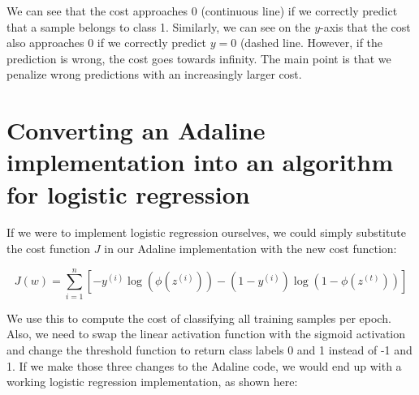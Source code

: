 \documentclass[11pt]{article}
\begin{document}
    We can see that the cost approaches 0 (continuous line) if we correctly
predict that a sample belongs to class 1. Similarly, we can see on the
\(y\)-axis that the cost also approaches 0 if we correctly predict
\(y=0\) (dashed line. However, if the prediction is wrong, the cost goes
towards infinity. The main point is that we penalize wrong predictions
with an increasingly larger cost.

    \section{Converting an Adaline implementation into an algorithm for
logistic
regression}\label{converting-an-adaline-implementation-into-an-algorithm-for-logistic-regression}

    If we were to implement logistic regression ourselves, we could simply
substitute the cost function \(J\) in our Adaline implementation with
the new cost function:

\[J(w) = \sum_{i = 1}^n [-y^{(i)} \log(\phi(z^{(i)})) - (1 - y^{(i)}) \log(1 - \phi(z^{(t)}))]\]

We use this to compute the cost of classifying all training samples per
epoch. Also, we need to swap the linear activation function with the
sigmoid activation and change the threshold function to return class
labels 0 and 1 instead of -1 and 1. If we make those three changes to
the Adaline code, we would end up with a working logistic regression
implementation, as shown here:
\end{document}
